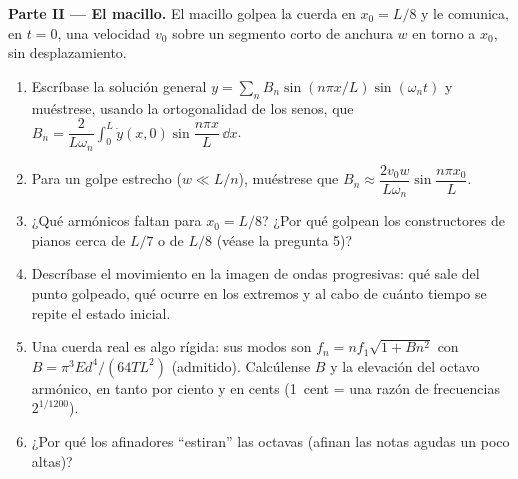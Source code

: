 \begin{problem}
\medskip
\noindent\textbf{Parte II --- El macillo.}
El macillo golpea la cuerda en $x_0 = L/8$ y le comunica, en $t = 0$, una
velocidad $v_0$ sobre un segmento corto de anchura $w$ en torno a $x_0$,
sin desplazamiento.
\begin{enumerate}[resume]
  \item Escríbase la solución general $y = \sum_nB_n\sin(n\pi x/L)\sin(\omega_nt)$
        y muéstrese, usando la ortogonalidad de los senos, que $B_n =
        \dfrac{2}{L\omega_n}\int_0^L\dot y(x, 0)\sin\dfrac{n\pi x}L\,\dd x$.
  \item Para un golpe estrecho ($w \ll L/n$), muéstrese que $B_n \approx \dfrac{2v_0w}
        {L\omega_n}\sin\dfrac{n\pi x_0}{L}$.
  \item ¿Qué armónicos faltan para $x_0 = L/8$? ¿Por qué golpean los
        constructores de pianos cerca de $L/7$ o de $L/8$ (véase la pregunta 5)?
  \item Descríbase el movimiento en la imagen de ondas progresivas: qué
        sale del punto golpeado, qué ocurre en los extremos y al cabo de
        cuánto tiempo se repite el estado inicial.
  \item Una cuerda real es algo rígida: sus modos son $f_n = nf_1
        \sqrt{1 + Bn^2}$ con $B = \pi^3Ed^4/(64TL^2)$ (admitido). Calcúlense
        $B$ y la elevación del octavo armónico, en tanto por ciento y
        en cents (\qty{1}{cent} = una razón de frecuencias $2^{1/1200}$).
  \item ¿Por qué los afinadores ``estiran'' las octavas (afinan las notas
        agudas un poco altas)?
\end{enumerate}


\end{problem}
